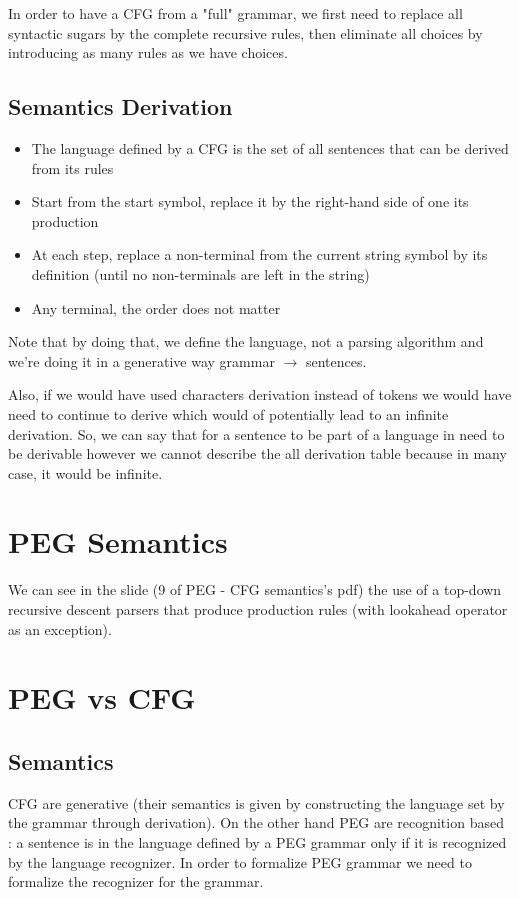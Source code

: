     In order to have a CFG from a "full" grammar, we first need to replace all
    syntactic sugars by the complete recursive rules, then eliminate all choices
    by introducing as many rules as we have choices.

    \subsection{Semantics Derivation}
        \begin{itemize}
            \item The language defined by a CFG is the set of all sentences that
            can be derived from its rules
            \item Start from the start symbol, replace it by the right-hand side
            of one its production
            \item At each step, replace a non-terminal from the current string
            symbol by its definition (until no non-terminals are left in the string)
            \item Any terminal, the order does not matter
        \end{itemize}
        Note that by doing that, we define the language, not a parsing algorithm
        and we're doing it in a generative way grammar $\rightarrow$ sentences.

        Also, if we would have used characters derivation instead of tokens we
        would have need to continue to derive which would of potentially lead to
        an infinite derivation. So, we can say that for a sentence to be part of
        a language in need to be derivable however we cannot describe the all
        derivation table because in many case, it would be infinite.
\section{PEG Semantics}
    We can see in the slide (9 of PEG - CFG semantics's pdf) the use of a
    top-down recursive descent parsers that produce production rules (with
    lookahead operator as an exception).

\section{PEG vs CFG}
    \subsection{Semantics}
        CFG are generative (their semantics is given by constructing the language
        set by the grammar through derivation). On the other hand PEG are
        recognition based : a sentence is in the language defined by a PEG grammar
        only if it is recognized by the language recognizer. In order to formalize
        PEG grammar we need to formalize the recognizer for the grammar.


